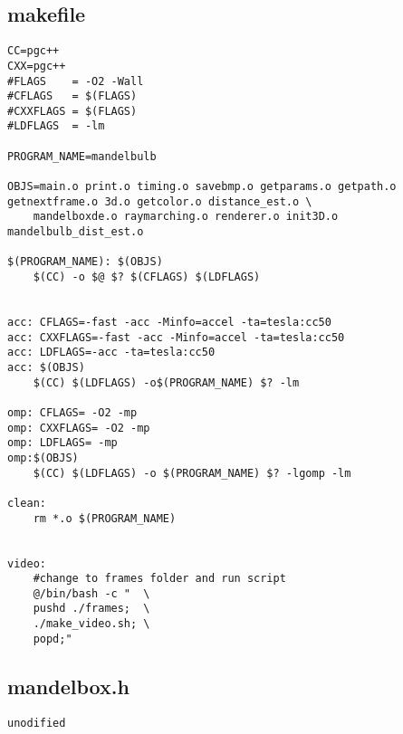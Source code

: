 \documentclass[]{article}
\begin{document}
\subsection*{makefile}
\begin{Verbatim}[fontsize= \footnotesize, tabsize=4]
CC=pgc++
CXX=pgc++
#FLAGS    = -O2 -Wall
#CFLAGS   = $(FLAGS)
#CXXFLAGS = $(FLAGS)
#LDFLAGS  = -lm

PROGRAM_NAME=mandelbulb

OBJS=main.o print.o timing.o savebmp.o getparams.o getpath.o getnextframe.o 3d.o getcolor.o distance_est.o \
	mandelboxde.o raymarching.o renderer.o init3D.o mandelbulb_dist_est.o

$(PROGRAM_NAME): $(OBJS)
	$(CC) -o $@ $? $(CFLAGS) $(LDFLAGS)


acc: CFLAGS=-fast -acc -Minfo=accel -ta=tesla:cc50
acc: CXXFLAGS=-fast -acc -Minfo=accel -ta=tesla:cc50
acc: LDFLAGS=-acc -ta=tesla:cc50
acc: $(OBJS)
	$(CC) $(LDFLAGS) -o$(PROGRAM_NAME) $? -lm

omp: CFLAGS= -O2 -mp
omp: CXXFLAGS= -O2 -mp
omp: LDFLAGS= -mp
omp:$(OBJS)
	$(CC) $(LDFLAGS) -o $(PROGRAM_NAME) $? -lgomp -lm

clean:
	rm *.o $(PROGRAM_NAME)


video:
	#change to frames folder and run script
	@/bin/bash -c "  \
	pushd ./frames;  \
	./make_video.sh; \
	popd;"

\end{Verbatim}

\subsection*{mandelbox.h}
\begin{Verbatim}[fontsize= \footnotesize, tabsize=4]
unodified
\end{Verbatim}
\end{document}
